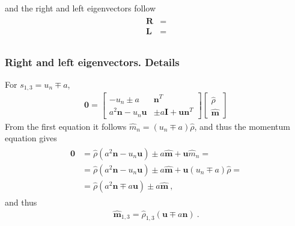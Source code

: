 \documentclass[letterpaper,10pt,english]{jupyterBook}
\begin{document}
\sphinxAtStartPar
and the right and left eigenvectors follow
\begin{equation*}
\begin{split}\begin{aligned}
  \mathbf{R} & = \\
  \mathbf{L} & = \\
\end{aligned}\end{split}
\end{equation*}\subsubsection*{Right and left eigenvectors. Details}

\sphinxAtStartPar
For \(s_{1,3} = u_n \mp  a\),
\begin{equation*}
\begin{split}
\mathbf{0} = \begin{bmatrix} -u_n \pm a & \mathbf{n}^T \\ a^2 \mathbf{n} - u_n \mathbf{u} & \pm a \mathbf{I} + \mathbf{u} \mathbf{n}^T \end{bmatrix}
\begin{bmatrix} \hat{\rho} \\ \hat{\mathbf{m}} \end{bmatrix}
\end{split}
\end{equation*}
\sphinxAtStartPar
From the first equation it follows \(\hat{m}_n = ( u_n \mp a ) \hat{\rho}\), and thus the momentum equation gives
\begin{equation*}
\begin{split}\begin{aligned}
  \mathbf{0}
  & = \hat{\rho} ( a^2 \mathbf{n} - u_n \mathbf{u} ) \pm a \hat{\mathbf{m}} + \mathbf{u} \hat{m}_n = \\
  & = \hat{\rho} ( a^2 \mathbf{n} - u_n \mathbf{u} ) \pm a \hat{\mathbf{m}} + \mathbf{u} ( u_n \mp a ) \hat{\rho} = \\
  & = \hat{\rho} ( a^2 \mathbf{n} \mp a \mathbf{u} ) \pm a \hat{\mathbf{m}} \ ,
\end{aligned}\end{split}
\end{equation*}
\sphinxAtStartPar
and thus
\begin{equation*}
\begin{split}\hat{\mathbf{m}}_{1,3} = \hat{\rho}_{1,3} ( \mathbf{u} \mp a \mathbf{n} ) \ . \end{split}
\end{equation*}
\end{document}
